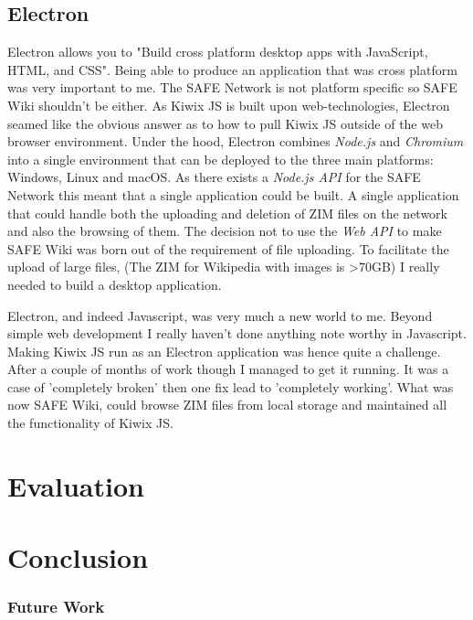 \documentclass{l4proj}
\begin{document}
\section{Electron}

Electron allows you to "Build cross platform desktop apps with JavaScript, HTML, and CSS". Being able to produce an application that was cross platform was very important to me. The SAFE Network is not platform specific so SAFE Wiki shouldn't be either. As Kiwix JS is built upon web-technologies, Electron seamed like the obvious answer as to how to pull Kiwix JS outside of the web browser environment. Under the hood, Electron combines \textit{Node.js} and \textit{Chromium} into a single environment that can be deployed to the three main platforms: Windows, Linux and macOS. As there exists a \textit{Node.js API} for the SAFE Network this meant that a single application could be built. A single application that could handle both the uploading and deletion of ZIM files on the network and also the browsing of them. The decision not to use the \textit{Web API} to make SAFE Wiki was born out of the requirement of file uploading. To facilitate the upload of large files, (The ZIM for Wikipedia with images is \textgreater 70GB) I really needed to build a desktop application. 

Electron, and indeed Javascript, was very much a new world to me. Beyond simple web development I really haven't done anything note worthy in Javascript. Making Kiwix JS run as an Electron application was hence quite a challenge. After a couple of months of work though I managed to get it running. It was a case of 'completely broken' then one fix lead to 'completely working'. What was now SAFE Wiki, could browse ZIM files from local storage and maintained all the functionality of Kiwix JS.

\chapter{Evaluation}

\chapter{Conclusion}

\subsection{Future Work}

\printbibliography
\end{document}
